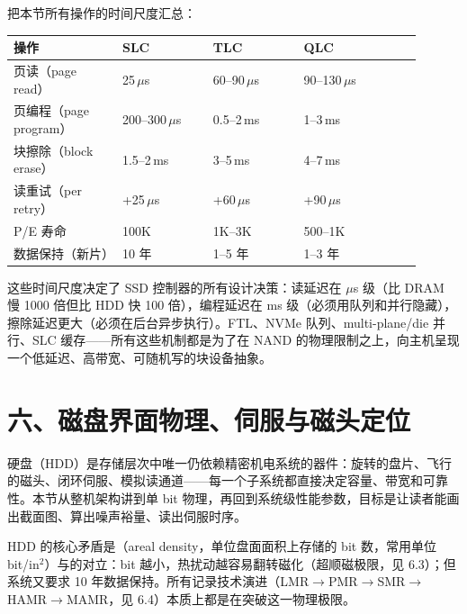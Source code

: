 

把本节所有操作的时间尺度汇总：

\begin{longtable}{L{0.24\linewidth}L{0.2\linewidth}L{0.2\linewidth}L{0.26\linewidth}}
\toprule
操作 & SLC & TLC & QLC \\
\midrule
页读（page read） & 25\,$\mu$s & 60--90\,$\mu$s & 90--130\,$\mu$s \\
页编程（page program） & 200--300\,$\mu$s & 0.5--2\,ms & 1--3\,ms \\
块擦除（block erase） & 1.5--2\,ms & 3--5\,ms & 4--7\,ms \\
读重试（per retry） & +25\,$\mu$s & +60\,$\mu$s & +90\,$\mu$s \\
P/E 寿命 & 100K & 1K--3K & 500--1K \\
数据保持（新片） & 10 年 & 1--5 年 & 1--3 年 \\
\bottomrule
\end{longtable}

这些时间尺度决定了 SSD 控制器的所有设计决策：读延迟在 $\mu$s 级（比 DRAM 慢 1000 倍但比 HDD 快 100 倍），编程延迟在 ms 级（必须用队列和并行隐藏），擦除延迟更大（必须在后台异步执行）。FTL、NVMe 队列、multi-plane/die 并行、SLC 缓存——所有这些机制都是为了在 NAND 的物理限制之上，向主机呈现一个低延迟、高带宽、可随机写的块设备抽象。

\section{六、磁盘界面物理、伺服与磁头定位}

硬盘（HDD）是存储层次中唯一仍依赖精密机电系统的器件：旋转的盘片、飞行的磁头、闭环伺服、模拟读通道——每一个子系统都直接决定容量、带宽和可靠性。本节从整机架构讲到单 bit 物理，再回到系统级性能参数，目标是让读者能画出截面图、算出噪声裕量、读出伺服时序。

\begin{keyidea}
HDD 的核心矛盾是（areal density，单位盘面面积上存储的 bit 数，常用单位 bit/in$^2$）与的对立：bit 越小，热扰动越容易翻转磁化（超顺磁极限，见 6.3）；但系统又要求 10 年数据保持。所有记录技术演进（LMR$\to$PMR$\to$SMR$\to$HAMR$\to$MAMR，见 6.4）本质上都是在突破这一物理极限。
\end{keyidea}

